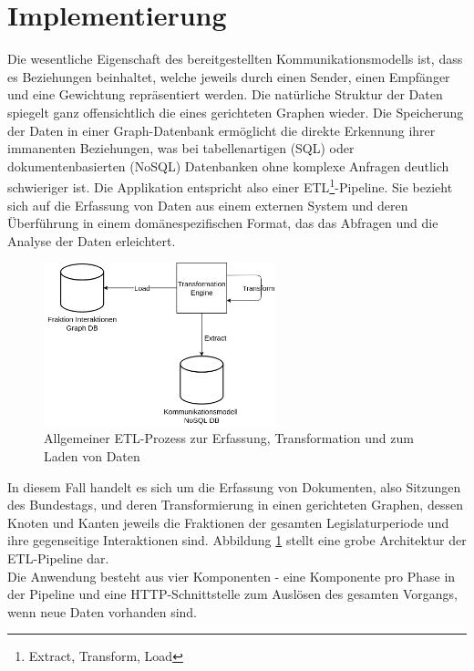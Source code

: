 \section{Implementierung}\label{sec:06_04_implementierung}
Die wesentliche Eigenschaft des bereitgestellten Kommunikationsmodells ist, dass es Beziehungen beinhaltet, welche jeweils durch einen Sender, einen Empfänger und eine Gewichtung repräsentiert werden. 
Die natürliche Struktur der Daten spiegelt ganz offensichtlich die eines gerichteten Graphen wieder. 
Die Speicherung der Daten in einer Graph-Datenbank ermöglicht die direkte Erkennung ihrer immanenten Beziehungen, was bei tabellenartigen (SQL) oder dokumentenbasierten (NoSQL) Datenbanken ohne komplexe Anfragen deutlich schwieriger ist. 
Die Applikation entspricht also einer ETL\footnote{Extract, Transform, Load}-Pipeline. Sie bezieht sich auf die Erfassung von Daten aus einem externen System und deren Überführung in einem domänespezifischen
Format, das das Abfragen und die Analyse der Daten erleichtert. 
\begin{figure}[H]
    \centering
    \includegraphics[width=0.60\textwidth]{images/ETL_Factions.png}
    \caption{Allgemeiner ETL-Prozess zur Erfassung, Transformation und zum Laden von Daten}
    \label{fig:faction-etl}
\end{figure}
In diesem Fall handelt es sich um die Erfassung von Dokumenten, also Sitzungen des Bundestags, und deren Transformierung in einen gerichteten Graphen, dessen Knoten und Kanten jeweils die 
Fraktionen der gesamten Legislaturperiode und ihre gegenseitige Interaktionen sind. Abbildung \ref{fig:faction-etl} stellt eine grobe Architektur der ETL-Pipeline dar.\\
Die Anwendung besteht aus vier Komponenten - eine Komponente pro Phase in der Pipeline und eine HTTP-Schnittstelle zum Auslösen des gesamten Vorgangs, wenn neue Daten vorhanden sind.
